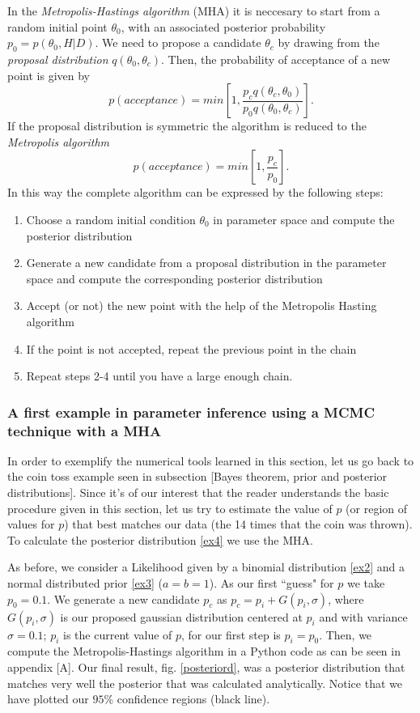 \documentclass[onecolumn,           %
               showpacs,            %
               preprintnumbers,     %
               aps,                 %
               prl,          	    %
               letterpaper,             %
               superscriptaddress,      %
               nofootinbib,         %
               tightenlines,        %
               floats,floatfix      %
               ,usenatbib,
               ]{revtex4-1}
\begin{document}
In the \textit{Metropolis-Hastings algorithm} (MHA) \cite{metr} it is neccesary to start from a random initial point $\theta_0$, with an associated posterior probability $p_0=p(\theta_0,H|D)$. We need to propose a candidate $\theta_c$ by drawing from the \textit{proposal distribution} $q(\theta_0,\theta_c)$. Then, the probability of acceptance of a new point is given by
\begin{equation}
p(acceptance)=min\left[1,\frac{p_cq(\theta_c,\theta_0)}{p_0q(\theta_0,\theta_c)}\right].
\end{equation}
If the proposal distribution is symmetric the algorithm is reduced to the \textit{Metropolis algorithm}
  \begin{equation}
  p(acceptance)=min\left[1,\frac{p_c}{p_0}\right].
  \end{equation}
In this way the complete algorithm can be expressed by the following steps:
\begin{enumerate}
\item Choose a random initial condition $\theta_0$ in parameter space and compute the posterior distribution
\item Generate a new candidate from a proposal distribution in the parameter space and compute the corresponding posterior distribution
\item Accept (or not) the new point with the help of the Metropolis Hasting algorithm
\item If the point is not accepted, repeat the previous point in the chain
\item Repeat steps 2-4 until you have a large enough chain.
\end{enumerate}

\subsubsection{A first example in parameter inference using a MCMC technique with a MHA}

In order to exemplify the numerical tools learned in this section, let us 
go back to the coin toss example seen in subsection [Bayes theorem, prior and posterior distributions]. Since it's of our interest that the reader understands the basic procedure given in this section, let us try to estimate the value of $p$ (or region of values for $p$) that best matches our data (the 14 times that the coin was thrown). To calculate the posterior distribution \eqref{ex4} we use the MHA. 

As before, we consider a Likelihood given by a binomial distribution \eqref{ex2} and a normal distributed prior \eqref{ex3} ($a=b=1$). As our first ``guess" for $p$ we take $p_0=0.1$. We generate a new candidate $p_c$ as $p_c=p_i+G(p_i,\sigma)$, where $G(p_i,\sigma)$ is our proposed gaussian distribution centered at $p_i$ and with variance $\sigma=0.1$; $p_i$ is the current value of $p$, for our first step is $p_i=p_0$. Then, we compute the Metropolis-Hastings algorithm in a Python code as can be seen in appendix [A]. Our final result,  fig. \ref{posteriord}, was a posterior distribution that matches very well the posterior that was calculated analytically. Notice that we have plotted our $95\%$ confidence regions (black line). 
\end{document}
